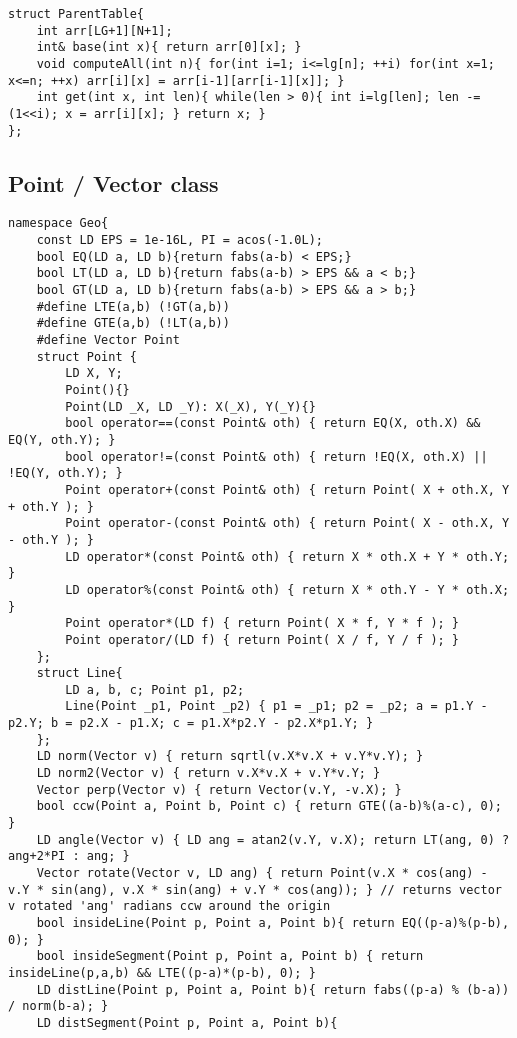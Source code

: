 \documentclass[12pt,a4paper,onesided]{article}
\begin{document}
\begin{multicols}{3}
\begin{lstlisting}
struct ParentTable{
	int arr[LG+1][N+1];
	int& base(int x){ return arr[0][x]; }
	void computeAll(int n){ for(int i=1; i<=lg[n]; ++i) for(int x=1; x<=n; ++x) arr[i][x] = arr[i-1][arr[i-1][x]]; }
	int get(int x, int len){ while(len > 0){ int i=lg[len]; len -= (1<<i); x = arr[i][x]; } return x; }
};

\end{lstlisting}



\subsection{Point / Vector class}
\begin{lstlisting}
namespace Geo{
	const LD EPS = 1e-16L, PI = acos(-1.0L);
	bool EQ(LD a, LD b){return fabs(a-b) < EPS;}
	bool LT(LD a, LD b){return fabs(a-b) > EPS && a < b;}
	bool GT(LD a, LD b){return fabs(a-b) > EPS && a > b;}
	#define LTE(a,b) (!GT(a,b))
	#define GTE(a,b) (!LT(a,b))
	#define Vector Point
	struct Point {
		LD X, Y;
		Point(){}
		Point(LD _X, LD _Y): X(_X), Y(_Y){}
		bool operator==(const Point& oth) { return EQ(X, oth.X) && EQ(Y, oth.Y); }
		bool operator!=(const Point& oth) { return !EQ(X, oth.X) || !EQ(Y, oth.Y); }
		Point operator+(const Point& oth) { return Point( X + oth.X, Y + oth.Y ); }
		Point operator-(const Point& oth) { return Point( X - oth.X, Y - oth.Y ); }
		LD operator*(const Point& oth) { return X * oth.X + Y * oth.Y; }
		LD operator%(const Point& oth) { return X * oth.Y - Y * oth.X; }
		Point operator*(LD f) { return Point( X * f, Y * f ); }
		Point operator/(LD f) { return Point( X / f, Y / f ); }
	};
	struct Line{
		LD a, b, c; Point p1, p2;
		Line(Point _p1, Point _p2) { p1 = _p1; p2 = _p2; a = p1.Y - p2.Y; b = p2.X - p1.X; c = p1.X*p2.Y - p2.X*p1.Y; }
	};
	LD norm(Vector v) { return sqrtl(v.X*v.X + v.Y*v.Y); }
	LD norm2(Vector v) { return v.X*v.X + v.Y*v.Y; }
	Vector perp(Vector v) { return Vector(v.Y, -v.X); }
	bool ccw(Point a, Point b, Point c) { return GTE((a-b)%(a-c), 0); }
	LD angle(Vector v) { LD ang = atan2(v.Y, v.X); return LT(ang, 0) ? ang+2*PI : ang; }
	Vector rotate(Vector v, LD ang) { return Point(v.X * cos(ang) - v.Y * sin(ang), v.X * sin(ang) + v.Y * cos(ang)); } // returns vector v rotated 'ang' radians ccw around the origin
	bool insideLine(Point p, Point a, Point b){ return EQ((p-a)%(p-b), 0); }
	bool insideSegment(Point p, Point a, Point b) { return insideLine(p,a,b) && LTE((p-a)*(p-b), 0); }
	LD distLine(Point p, Point a, Point b){ return fabs((p-a) % (b-a)) / norm(b-a); }
	LD distSegment(Point p, Point a, Point b){

\end{lstlisting}
\end{multicols}
\end{document}

